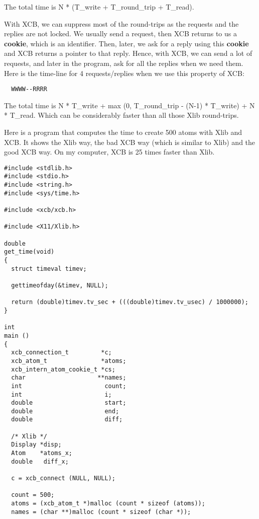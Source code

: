 \documentclass[12pt,oneside,titlepage]{book}
\begin{document}
\begin{enumerate}
\begin{enumerate}
    The total time is N * (T\_write + T\_round\_trip + T\_read).

    With XCB, we can suppress most of the round-trips as the requests
    and the replies are not locked. We usually send a request, then XCB
    returns to us a \textbf{cookie}, which is an identifier. Then,
    later, we ask for a reply using this \textbf{cookie} and XCB returns
    a pointer to that reply. Hence, with XCB, we can send a lot of
    requests, and later in the program, ask for all the replies when we
    need them. Here is the time-line for 4 requests/replies when we use
    this property of XCB:

\begin{verbatim}
  WWWW--RRRR
\end{verbatim}

    The total time is N * T\_write + max (0, T\_round\_trip - (N-1) *
    T\_write) + N * T\_read. Which can be considerably faster than all
    those Xlib round-trips.

    Here is a program that computes the time to create 500 atoms with
    Xlib and XCB. It shows the Xlib way, the bad XCB way (which is
    similar to Xlib) and the good XCB way. On my computer, XCB is 25
    times faster than Xlib.

\begin{verbatim}
#include <stdlib.h>
#include <stdio.h>
#include <string.h>
#include <sys/time.h>

#include <xcb/xcb.h>

#include <X11/Xlib.h>

double
get_time(void)
{
  struct timeval timev;

  gettimeofday(&timev, NULL);

  return (double)timev.tv_sec + (((double)timev.tv_usec) / 1000000);
}

int
main ()
{
  xcb_connection_t         *c;
  xcb_atom_t               *atoms;
  xcb_intern_atom_cookie_t *cs;
  char                    **names;
  int                       count;
  int                       i;
  double                    start;
  double                    end;
  double                    diff;

  /* Xlib */
  Display *disp;
  Atom    *atoms_x;
  double   diff_x;

  c = xcb_connect (NULL, NULL);

  count = 500;
  atoms = (xcb_atom_t *)malloc (count * sizeof (atoms));
  names = (char **)malloc (count * sizeof (char *));


\end{verbatim}
\end{enumerate}
\end{enumerate}
\end{document}
